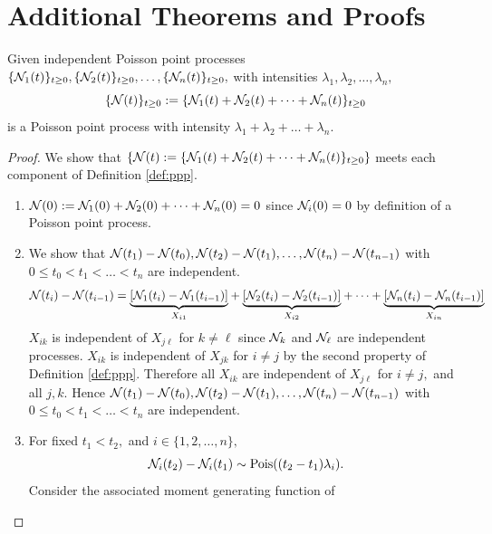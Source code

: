 \chapter{Additional Theorems and Proofs}

\begin{theorem}\label{thm:sum_ppp}
    Given independent Poisson point processes $\{\mathcal{N}_1(t)\}_{t\geq0},
        \{\mathcal{N}_2(t)\}_{t\geq0}, \dots,  \{\mathcal{N}_n(t)\}_{t\geq0},$ with intensities
    $\lambda_1, \lambda_2, \dots, \lambda_n,$
    $$\{\mathcal{N}(t)\}_{t\geq0} := \{\mathcal{N}_1(t) + \mathcal{N}_2(t) + \dots + \mathcal{N}_n(t)\}_{t\geq0}$$ is a Poisson point process with intensity $\lambda_1 + \lambda_2 + \dots +
        \lambda_n.$
\end{theorem}

\begin{proof}
    We show that
    $\{\mathcal{N}(t) := \{\mathcal{N}_1(t) + \mathcal{N}_2(t) + \dots + \mathcal{N}_n(t)\}_{t\geq0}\}$ meets each
    component of Definition \ref{def:ppp}.
    \begin{enumerate}
        \item $\mathcal{N}(0) := \mathcal{N}_1(0) + \mathcal{N}_2(0) + \dots + \mathcal{N}_n(0) = 0$ since
              $\mathcal{N}_i(0) = 0$ by definition of a Poisson point process.
        \item We show that $\mathcal{N}(t_1) - \mathcal{N}(t_0), \mathcal{N}(t_2) - \mathcal{N}(t_1), \dots,
                  \mathcal{N}(t_n) - \mathcal{N}(t_{n - 1})$
              with $0 \leq t_0 < t_1 < \dots < t_n$ are independent.
              $$\mathcal{N}(t_i) - \mathcal{N}(t_{i - 1})
                  = \underset{X_{i1}}
                  {\underbrace{[\mathcal{N}_1(t_i) - \mathcal{N}_1(t_{i - 1})]}}
                  + \underset{X_{i2}}
                  {\underbrace{[\mathcal{N}_2(t_i) - \mathcal{N}_2(t_{i - 1})]}} + \dots
                  + \underset{X_{in}}
                  {\underbrace{[\mathcal{N}_n(t_i) - \mathcal{N}_n(t_{i - 1})]}}$$
              $X_{ik}$ is independent of $X_{j\ell}$ for $k \neq \ell$ since
              $\mathcal{N}_k$ and $\mathcal{N}_\ell$ are independent processes. $X_{ik}$ is
              independent of $X_{jk}$ for $i\neq j$ by the second property
              of Definition \ref{def:ppp}. Therefore all $X_{ik}$ are
              independent of $X_{j\ell}$ for $i\neq j,$ and all $j, k.$
              Hence
              $\mathcal{N}(t_1) - \mathcal{N}(t_0), \mathcal{N}(t_2) - \mathcal{N}(t_1), \dots,
                  \mathcal{N}(t_n) - \mathcal{N}(t_{n - 1})$
              with $0 \leq t_0 < t_1 < \dots < t_n$ are independent.
        \item For fixed $t_1 < t_2,$ and $i \in \{1, 2, \dots, n\},$
              $$\mathcal{N}_i(t_2) - \mathcal{N}_i(t_1) \sim \operatorname{Pois}((t_2 - t_1)\lambda_i).$$
              Consider the associated moment generating function of

\end{enumerate}
\end{proof}
